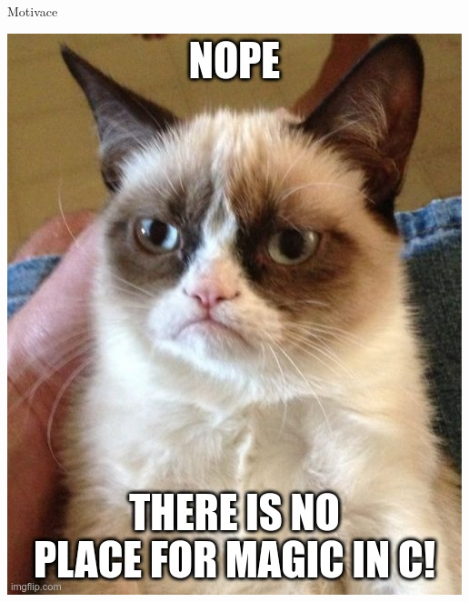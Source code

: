 \documentclass[handout]{beamer}
\begin{document}
\begin{frame}{Motivace}
    \begin{center}
        \includegraphics[height=0.7\textheight]{pictures/grumpy.jpeg}
    \end{center}
\end{frame}
\end{document}
